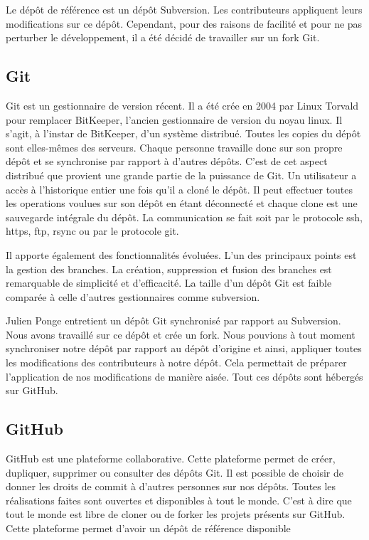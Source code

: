 Le dépôt de référence est un dépôt Subversion. Les contributeurs appliquent leurs modifications sur ce dépôt. Cependant, pour des raisons de facilité et pour ne pas perturber le développement, il a été décidé de travailler sur un fork Git.
\subsection{Git}
Git est un gestionnaire de version récent. Il a été crée en 2004 par Linux Torvald pour remplacer BitKeeper, l'ancien gestionnaire de version du noyau linux.
Il s'agit, à l'instar de BitKeeper, d'un système distribué. Toutes les copies du dépôt sont elles-mêmes des serveurs.
Chaque personne travaille donc sur son propre dépôt et se synchronise par rapport à d'autres dépôts. C'est de cet aspect distribué que provient une grande partie de la puissance de Git.
Un utilisateur a accès à l'historique entier une fois qu'il a cloné le dépôt. Il peut effectuer toutes les operations voulues sur son dépôt en étant déconnecté et chaque clone est une sauvegarde intégrale du dépôt.
La communication se fait soit par le protocole ssh, https, ftp, rsync ou par le protocole git.

Il apporte également des fonctionnalités évoluées. L'un des principaux points est la gestion des branches. La création, suppression et fusion des branches est remarquable de simplicité et d'efficacité.
La taille d'un dépôt Git est faible comparée à celle d'autres gestionnaires comme subversion.

Julien Ponge entretient un dépôt Git synchronisé par rapport au Subversion. Nous avons travaillé sur ce dépôt et crée un fork.
Nous pouvions à tout moment synchroniser notre dépôt par rapport au dépôt d'origine et ainsi, appliquer toutes les modifications des contributeurs à notre dépôt.
Cela permettait de préparer l'application de nos modifications de manière aisée. Tout ces dépôts sont hébergés sur GitHub.
\subsection{GitHub}
GitHub est une plateforme collaborative. Cette plateforme permet de créer, dupliquer, supprimer ou consulter des dépôts Git.
Il est possible de choisir de donner les droits de commit à d'autres personnes sur nos dépôts. Toutes les réalisations faites sont ouvertes et disponibles à tout le monde.
C'est à dire que tout le monde est libre de cloner ou de forker les projets présents sur GitHub.
Cette plateforme permet d'avoir un dépôt de référence disponible 
